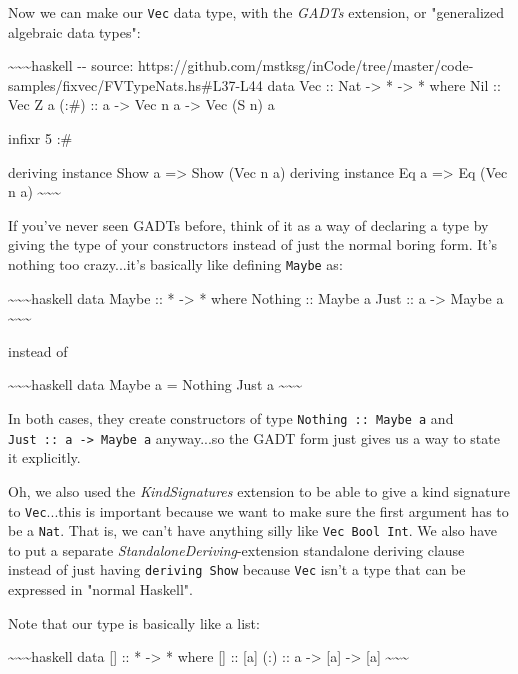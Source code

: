\documentclass[]{article}
\begin{document}
Now we can make our \texttt{Vec} data type, with the \emph{GADTs} extension, or
"generalized algebraic data types":

\textasciitilde{}\textasciitilde{}\textasciitilde{}haskell -\/- source:
https://github.com/mstksg/inCode/tree/master/code-samples/fixvec/FVTypeNats.hs\#L37-L44
data Vec :: Nat -\textgreater{} * -\textgreater{} * where Nil :: Vec Z a (:\#)
:: a -\textgreater{} Vec n a -\textgreater{} Vec (S n) a

infixr 5 :\#

deriving instance Show a =\textgreater{} Show (Vec n a) deriving instance Eq a
=\textgreater{} Eq (Vec n a) \textasciitilde{}\textasciitilde{}\textasciitilde{}

If you've never seen GADTs before, think of it as a way of declaring a type by
giving the type of your constructors instead of just the normal boring form.
It's nothing too crazy...it's basically like defining \texttt{Maybe} as:

\textasciitilde{}\textasciitilde{}\textasciitilde{}haskell data Maybe :: *
-\textgreater{} * where Nothing :: Maybe a Just :: a -\textgreater{} Maybe a
\textasciitilde{}\textasciitilde{}\textasciitilde{}

instead of

\textasciitilde{}\textasciitilde{}\textasciitilde{}haskell data Maybe a =
Nothing \textbar{} Just a \textasciitilde{}\textasciitilde{}\textasciitilde{}

In both cases, they create constructors of type \texttt{Nothing\ ::\ Maybe\ a}
and \texttt{Just\ ::\ a\ -\textgreater{}\ Maybe\ a} anyway...so the GADT form
just gives us a way to state it explicitly.

Oh, we also used the \emph{KindSignatures} extension to be able to give a kind
signature to \texttt{Vec}...this is important because we want to make sure the
first argument has to be a \texttt{Nat}. That is, we can't have anything silly
like \texttt{Vec\ Bool\ Int}. We also have to put a separate
\emph{StandaloneDeriving}-extension standalone deriving clause instead of just
having \texttt{deriving\ Show} because \texttt{Vec} isn't a type that can be
expressed in "normal Haskell".

Note that our type is basically like a list:

\textasciitilde{}\textasciitilde{}\textasciitilde{}haskell data {[}{]} :: *
-\textgreater{} * where {[}{]} :: {[}a{]} (:) :: a -\textgreater{} {[}a{]}
-\textgreater{} {[}a{]} \textasciitilde{}\textasciitilde{}\textasciitilde{}
\end{document}
